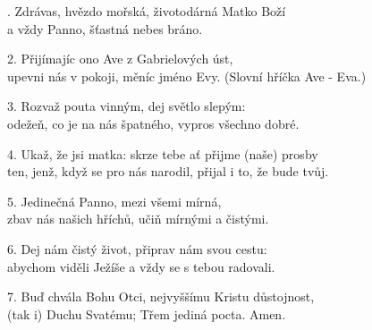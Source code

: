 . Zdrávas, hvězdo mořská, životodárná Matko Boží\\
a vždy Panno, šťastná nebes bráno.

2. Přijímajíc ono Ave z Gabrielových úst,\\
upevni nás v pokoji, měníc jméno Evy.
(Slovní hříčka Ave - Eva.)

3. Rozvaž pouta vinným, dej světlo slepým:\\
odežeň, co je na nás špatného, vypros všechno dobré.

4. Ukaž, že jsi matka: skrze tebe ať přijme (naše) prosby\\
ten, jenž, když se pro nás narodil, přijal i to, že bude tvůj.

5. Jedinečná Panno, mezi všemi mírná,\\
zbav nás našich hříchů, učiň mírnými a čistými.

6. Dej nám čistý život, připrav nám svou cestu:\\
abychom viděli Ježíše a vždy se s tebou radovali.

7. Buď chvála Bohu Otci, nejvyššímu Kristu důstojnost,\\
(tak i) Duchu Svatému; Třem jediná pocta. Amen.
